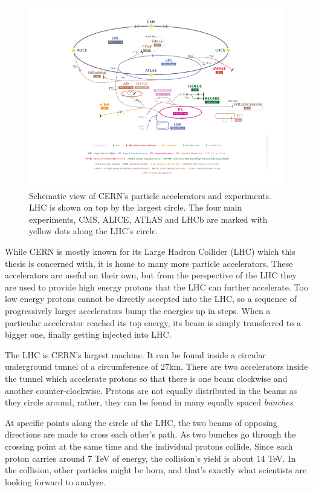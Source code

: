\documentclass[12pt]{article}
\begin{document}
\begin{figure}[H]
	\includegraphics[width=\textwidth]{accelerator_complex}
	\caption{Schematic view of CERN's particle accelerators and experiments. LHC is shown on top by the largest circle. The four main experiments, CMS, ALICE, ATLAS and LHCb are marked with yellow dots along the LHC's circle.}
	\label{fig_accel_complex}
\end{figure}

While CERN is mostly known for its Large Hadron Collider (LHC) which this thesis is concerned with, it is home to many more particle accelerators. These accelerators are useful on their own, but from the perspective of the LHC they are used to provide high energy protons that the LHC can further accelerate. Too low energy protons cannot be directly accepted into the LHC, so a sequence of progressively larger accelerators bump the energies up in steps. When a particular accelerator reached its top energy, its beam is simply transferred to a bigger one, finally getting injected into LHC.

The LHC is CERN's largest machine. It can be found inside a circular underground tunnel of a circumference of 27km. There are two accelerators inside the tunnel which accelerate protons so that there is one beam clockwise and another counter-clockwise. Protons are not equally distributed in the beams as they circle around, rather, they can be found in many equally spaced \textit{bunches}.

At specific points along the circle of the LHC, the two beams of opposing directions are made to cross each other's path. As two bunches go through the crossing point at the same time and the individual protons collide\cite{lhc_bunch_collisions}. Since each proton carries around 7 TeV of energy, the collision's yield is about 14 TeV. In the collision, other particles might be born, and that's exactly what scientists are looking forward to analyze.	
\end{document}
